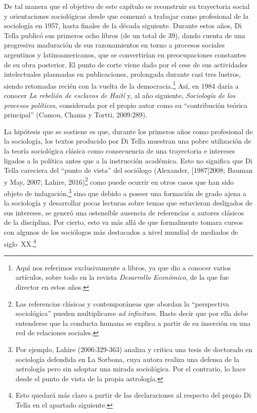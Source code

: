 De tal manera que el objetivo de este capítulo es reconstruir su trayectoria social y orientaciones sociológicas desde que comenzó a trabajar como profesional de la sociología en 1957, hasta finales de la década siguiente. Durante estos años, Di Tella publicó sus primeros ocho libros (de un total de 39), dando cuenta de una progresiva maduración de sus razonamientos en torno a procesos sociales argentinos y latinoamericanos, que se convertirían en preocupaciones constantes de su obra posterior. El punto de corte viene dado por el cese de sus actividades intelectuales plasmadas en publicaciones, prolongada durante casi tres lustros, siendo retomadas recién con la vuelta de la democracia.\footnote{Aquí nos referimos exclusivamente a libros, ya que dio a conocer varios artículos, sobre todo en la revista \emph{Desarrollo Económico}, de la que fue director en estos años.} Así, en 1984 daría a conocer \emph{La rebelión de esclavos de Haití} y, al año siguiente, \emph{Sociología de los procesos políticos}, considerada por el propio autor como su ``contribución teórica principal'' (Camou, Chama y Tortti, 2009:289).

La hipótesis que se sostiene es que, durante los primeros años como profesional de la sociología, los textos producido por Di Tella muestran una pobre utilización de la teoría sociológica clásica como consecuencia de una trayectoria e intereses ligados a la política antes que a la instrucción académica. Esto no significa que Di Tella careciera del ``punto de vista'' del sociólogo (Alexander, [1987]2008; Bauman y May, 2007; Lahire, 2016)\footnote{Las referencias clásicas y contemporáneas que abordan la ``perspectiva sociológica'' pueden multiplicarse \emph{ad infinitum}. Baste decir que por ella debe entenderse que la conducta humana se explica a partir de su inserción en una red de relaciones sociales.} como puede ocurrir en otros casos que han sido objeto de indagación,\footnote{Por ejemplo, Lahire (2006:329-363) analiza y critica una tesis de doctorado en sociología defendida en La Sorbona, cuya autora realiza una defensa de la astrología pero sin adoptar una mirada sociológica. Por el contrario, lo hace desde el punto de vista de la propia astrología.} sino que debido a poseer una formación de grado ajena a la sociología y desarrollar pocas lecturas sobre temas que estuvieran desligados de sus intereses, se generó una ostensible ausencia de referencias a autores clásicos de la disciplina. Por cierto, esto va más allá de que formalmente tomara cursos con algunos de los sociólogos más destacados a nivel mundial de mediados de siglo~XX.\footnote{Esto quedará más claro a partir de las declaraciones al respecto del propio Di Tella en el apartado siguiente.}

